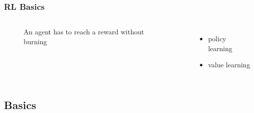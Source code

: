 \documentclass{beamer}
\begin{document}
\begin{frame}
    \frametitle{RL Basics}
    \begin{columns}
    \begin{figure}
    \caption{An agent has to reach a reward without burning}
    \end{figure}
    \begin{itemize}
        \item policy learning
        \item value learning
    \end{itemize}
    \end{columns}
\end{frame}
\subsection{Basics}
\end{document}
